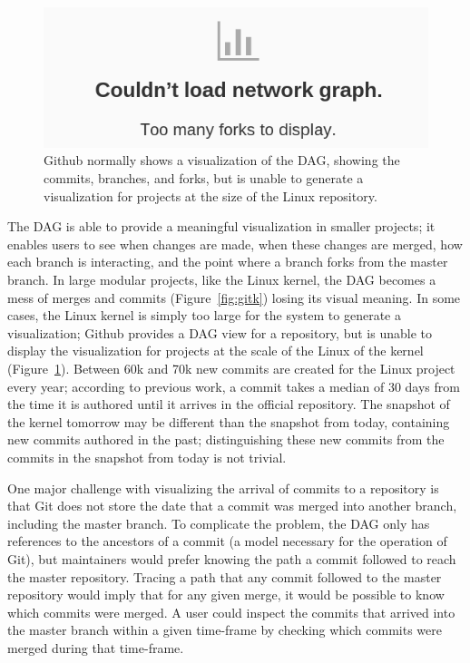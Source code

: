 \begin{figure}
        \centering
        \includegraphics[width=0.8\linewidth]{figures/github_viewer.png}
        \caption{Github normally shows a visualization of the DAG,
          showing the commits, branches, and forks, but is unable to
          generate a visualization for projects at the size of the Linux
          repository.}
        \label{fig:gitfail}
\end{figure}

The DAG is able to provide a meaningful visualization in smaller
projects; it enables users to see when changes are made, when these
changes are merged, how each branch is interacting, and the point where
a branch forks from the master branch. In large modular projects, like
the Linux kernel, the DAG becomes a mess of merges and commits
(Figure~\ref{fig:gitk}) losing its visual meaning. In some cases, the
Linux kernel is simply too large for the system to generate a
visualization; Github provides a DAG view for a repository, but is
unable to display the visualization for projects at the scale of the
Linux of the kernel (Figure~\ref{fig:gitfail}). Between 60k and 70k new
commits are created for the Linux project every year; according to
previous work\cite{German2015}, a commit takes a median of 30 days from
the time it is authored until it arrives in the official repository. The
snapshot of the kernel tomorrow may be different than the snapshot from
today, containing new commits authored in the past; distinguishing these
new commits from the commits in the snapshot from today is not trivial.

One major challenge with visualizing the arrival of commits to a
repository is that Git does not store the date that a commit was merged
into another branch, including the master branch. To complicate the
problem, the DAG only has references to the ancestors of a commit (a
model necessary for the operation of Git), but maintainers would prefer
knowing the path a commit followed to reach the master repository.
Tracing a path that any commit followed to the master repository would
imply that for any given merge, it would be possible to know which
commits were merged. A user could inspect the commits that arrived into
the master branch within a given time-frame by checking which commits
were merged during that time-frame.

